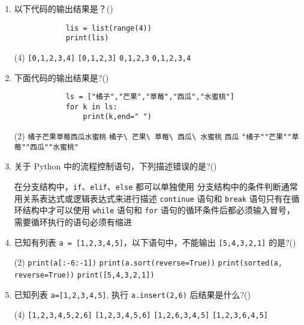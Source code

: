 \documentclass[11pt]{ctexart}
\begin{document}
\begin{enumerate}
        \item 以下代码的输出结果是？(\qquad)
        \begin{lstlisting}
            lis = list(range(4))
            print(lis)
        \end{lstlisting}
        \begin{tasks}(4)
            \task \lstinline![0,1,2,3,4]!
            \task \lstinline![0,1,2,3]!
            \task \lstinline!0,1,2,3!
            \task \lstinline!0,1,2,3,4!
        \end{tasks}

        \item 下面代码的输出结果是?(\qquad)
        \begin{lstlisting}
            ls = ["橘子","芒果","草莓","西瓜","水蜜桃"]
            for k in ls:    
                print(k,end=" ")
        \end{lstlisting}
        \begin{tasks}(2)
            \task \lstinline!橘子芒果草莓西瓜水蜜桃!
            \task \lstinline!橘子\ 芒果\ 草莓\ 西瓜\ 水蜜桃!
            \task \lstinline!西瓜!
            \task \lstinline!"橘子""芒果""草莓""西瓜""水蜜桃"!
        \end{tasks}

        \item  关于 Python 中的流程控制语句，下列描述错误的是?(\qquad)
        \begin{tasks}
            \task 在分支结构中，\lstinline{if}、\lstinline{elif}、\lstinline{else} 都可以单独使用
            \task 分支结构中的条件判断通常用关系表达式或逻辑表达式来进行描述
            \task \lstinline{continue} 语句和 \lstinline{break} 语句只有在循环结构中才可以使用
            \task \lstinline{while} 语句和 \lstinline{for} 语句的循环条件后都必须输入冒号，需要循环执行的语句必须有缩进
        \end{tasks}

        \item 已知有列表 \lstinline{a = [1,2,3,4,5]}，以下语句中，不能输出 \lstinline{[5,4,3,2,1]} 的是?(\qquad)
        \begin{tasks}(2)
            \task \lstinline!print(a[:-6:-1])!
            \task \lstinline!print(a.sort(reverse=True))!
            \task \lstinline!print(sorted(a, reverse=True))!
            \task \lstinline!print([5,4,3,2,1])!
        \end{tasks}

        \item 已知列表 \lstinline{a=[1,2,3,4,5]}, 执行 \lstinline{a.insert(2,6)} 后结果是什么?(\qquad)
        \begin{tasks}(4)
            \task \lstinline![1,2,3,4,5,2,6]!
            \task \lstinline![1,2,3,4,5,6]!
            \task \lstinline![1,2,6,3,4,5]!
            \task \lstinline![1,2,3,6,4,5]!
        \end{tasks}


\end{enumerate}
\end{document}
